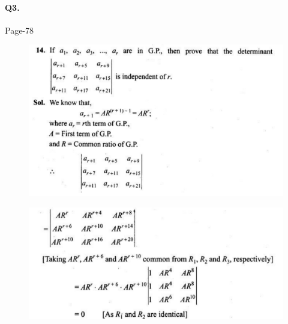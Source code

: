 \documentclass{article}
\begin{document}
\paragraph{Q3.}
\begin{flushright}
Page-78
\end{flushright}
\begin{figure}[H]
    \includegraphics[scale=0.5]{determinants_l5_ps_21.png}
\end{figure}
\begin{figure}[H]
    \includegraphics[scale=0.5]{determinants_l5_ps_22.png}
\end{figure}
\end{document}
